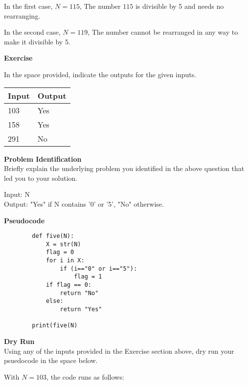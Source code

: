 \documentclass[a4paper]{exam}
\newcommand\heading[1]{\textbf{#1}}
\begin{document}
\begin{questions}
    In the first case, $N=115$, The number $115$ is divisible by 5 and needs no rearranging.

    In the second case, $N=119$, The number cannot be rearranged in any way to make it divisible by 5.

   \heading{Exercise}

    In the space provided, indicate the outputs for the given inputs.

    \begin{tabularx}{\textwidth}{|X|X|}
        \rowcolor{gray!50}
        \hline
        Input & Output \\ \hline\hline
        103   & Yes    \\\hline
        158   & Yes    \\\hline
        291   & No     \\\hline
    \end{tabularx}

    \heading{Problem Identification}\\
    Briefly explain the underlying problem you identified in the above question that led you to your solution.

Input: N \\
Output: "Yes" if N contains '0' or '5', "No" otherwise.


    \heading{Pseudocode}
    \begin{verbatim}
        def five(N):
            X = str(N)
            flag = 0
            for i in X:
                if (i=="0" or i=="5"):
                    flag = 1
            if flag == 0:
                return "No"
            else:
                return "Yes"

        print(five(N)
    \end{verbatim}

    \heading{Dry Run}\\
    Using any of the inputs provided in the Exercise section above, dry run your psuedocode in the space below.


With $N=103$, the code runs as follows:


\end{questions}
\end{document}
